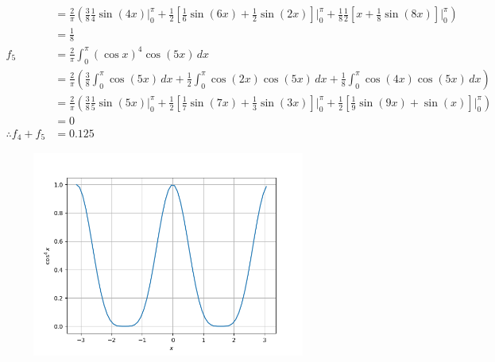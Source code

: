\documentclass[journal,12pt,onecolumn]{IEEEtran}
\theoremstyle{remark}
\begin{document}
\begin{align}
&= \frac{2}{\pi} \left( \frac{3}{8} \frac{1}{4} \sin(4x) \Bigg|_{0}^{\pi} + \frac{1}{2} \left[\frac{1}{6} \sin(6x) + \frac{1}{2}\sin(2x) \right] \Bigg|_{0}^{\pi} + \frac{1}{8} \frac{1}{2} \left[ x + \frac{1}{8} \sin(8x) \right] \Bigg|_{0}^{\pi}  \right) \\
&=\frac{1}{8} \\
f_5 &= \frac{2}{\pi} \int_{0}^{\pi} (\cos x)^4 \cos(5x) \, dx \\
&= \frac{2}{\pi} \left( \frac{3}{8} \int_{0}^{\pi} \cos(5x) \, dx + \frac{1}{2} \int_{0}^{\pi} \cos(2x) \cos(5x) \, dx + \frac{1}{8} \int_{0}^{\pi} \cos(4x) \cos(5x) \, dx \right) \\
&= \frac{2}{\pi} \left(\frac{3}{8} \frac{1}{5} \sin(5x) \Bigg|_{0}^{\pi} + \frac{1}{2} \left[ \frac{1}{7} \sin(7x) + \frac{1}{3} \sin(3x) \right] \Bigg|_{0}^{\pi} + \frac{1}{2} \left[ \frac{1}{9} \sin(9x) + \sin(x) \right] \Bigg|_{0}^{\pi} \right) \\
&= 0 \\
\therefore f_4+f_5 &= 0.125
\end{align}
\begin{figure}[ht]
	\centering
	\includegraphics[width=0.8\textwidth]{./figs/fig1.png}
\end{figure}
\end{document}
